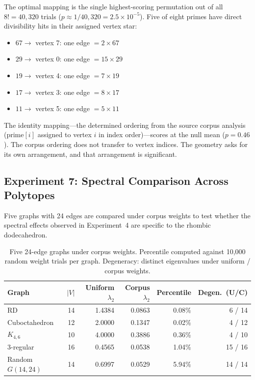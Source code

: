 \documentclass[11pt]{article}
\begin{document}
The optimal mapping is the single highest-scoring permutation out of
all $8! = 40{,}320$ trials ($p \approx 1/40{,}320 = 2.5 \times 10^{-5}$).
Five of eight primes have direct divisibility hits in their assigned
vertex star:
\begin{itemize}
  \item $67 \to$ vertex 7: one edge $= 2 \times 67$
  \item $29 \to$ vertex 0: one edge $= 15 \times 29$
  \item $19 \to$ vertex 4: one edge $= 7 \times 19$
  \item $17 \to$ vertex 3: one edge $= 8 \times 17$
  \item $11 \to$ vertex 5: one edge $= 5 \times 11$
\end{itemize}

The identity mapping---the determined ordering from the source
corpus analysis (prime$[i]$ assigned to vertex $i$ in index
order)---scores at the null mean ($p = 0.46$). The corpus ordering
does not transfer to vertex indices. The geometry asks for its own
arrangement, and that arrangement is significant.

\subsection{Experiment 7: Spectral Comparison Across Polytopes}

Five graphs with 24 edges are compared under corpus weights to test
whether the spectral effects observed in Experiment~4 are specific
to the rhombic dodecahedron.

\begin{table}[H]
\centering
\caption{Five 24-edge graphs under corpus weights. Percentile
  computed against 10{,}000 random weight trials per graph.
  Degeneracy: distinct eigenvalues under uniform / corpus weights.}
\label{tab:exp7}
\begin{tabular}{lrrrrr}
\toprule
Graph & $|V|$ & Uniform $\lambda_2$ & Corpus $\lambda_2$ & Percentile & Degen.\ (U/C) \\
\midrule
RD               & 14 & 1.4384 & 0.0863 & 0.08\% & 6 / 14 \\
Cuboctahedron    & 12 & 2.0000 & 0.1347 & 0.02\% & 4 / 12 \\
$K_{4,6}$        & 10 & 4.0000 & 0.3886 & 0.36\% & 4 / 10 \\
3-regular        & 16 & 0.4565 & 0.0538 & 1.04\% & 15 / 16 \\
Random $G(14,24)$ & 14 & 0.6997 & 0.0529 & 5.94\% & 14 / 14 \\
\bottomrule
\end{tabular}
\end{table}
\end{document}
